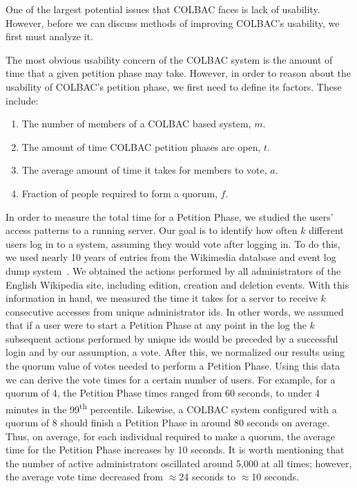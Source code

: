 One of the largest potential issues that COLBAC faces is lack of usability.
However, before we can discuss methods of improving COLBAC's usability, we first
must analyze it. 

The most obvious usability concern of the COLBAC system is the amount of time
that a given petition phase may take. However, in order to reason about the
usability of COLBAC's petition phase, we first need to define its factors. These
include:
\begin{enumerate}
\item The number of members of a COLBAC based system, $m$.
\item The amount of time COLBAC petition phases are open, $t$.
\item The average amount of time it takes for members to vote, $a$.
\item Fraction of people required to form a quorum, $f$.
\end{enumerate}


In order to measure the total time for a Petition Phase, we studied the
users’ access patterns to a running server. Our goal is to identify how often
$k$ different users log in to a system, assuming they would vote after logging
in. To do this, we used nearly 10 years of entries from the Wikimedia database
and event log dump system~\cite{wikidata}. We obtained the actions performed by
all administrators of the English Wikipedia site, including edition, creation
and deletion events. With this information in hand, we measured the time it
takes for a server to receive $k$ consecutive accesses from unique administrator
ids. In other words, we assumed that if a user were to start a Petition Phase at
any point in the log the $k$ subsequent actions performed by unique ids would be
preceded by a successful login and by our assumption, a vote. After this, we
normalized our results using the quorum value of votes needed to perform a
Petition Phase. 
Using this data we can derive the vote times for a certain number of users. For
example, for a quorum of 4, the Petition Phase times ranged from 60
seconds, to under 4 minutes in the 99\textsuperscript{th} percentile. Likewise,
a COLBAC system configured with a quorum of 8 should finish a Petition Phase
in around 80 seconds on average. Thus, on average, for each individual required
to make a quorum, the average time for the Petition Phase increases by 10
seconds. It is worth mentioning that the number of active administrators
oscillated around 5,000 at all times; however, the average vote time decreased
from $\approx$24 seconds to $\approx$10 seconds.

